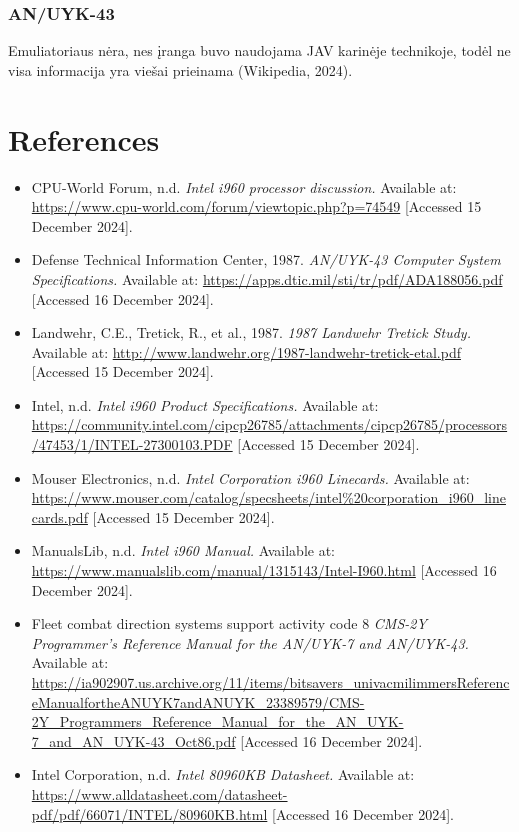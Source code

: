 \documentclass{article}
\begin{document}
\subsubsection{AN/UYK-43}
Emuliatoriaus nėra, nes įranga buvo naudojama JAV karinėje technikoje, todėl ne visa informacija yra viešai prieinama (Wikipedia, 2024).
\section{References}
\begin{itemize}
\item CPU-World Forum, n.d. \textit{Intel i960 processor discussion.} Available at: \url{https://www.cpu-world.com/forum/viewtopic.php?p=74549} [Accessed 15 December 2024].
\item Defense Technical Information Center, 1987. \textit{AN/UYK-43 Computer System Specifications.} Available at: \url{https://apps.dtic.mil/sti/tr/pdf/ADA188056.pdf} [Accessed 16 December 2024].

\item Landwehr, C.E., Tretick, R., et al., 1987. \textit{1987 Landwehr Tretick Study.} Available at: \url{http://www.landwehr.org/1987-landwehr-tretick-etal.pdf} [Accessed 15 December 2024].

\item Intel, n.d. \textit{Intel i960 Product Specifications.} Available at: \url{https://community.intel.com/cipcp26785/attachments/cipcp26785/processors/47453/1/INTEL-27300103.PDF} [Accessed 15 December 2024].

\item Mouser Electronics, n.d. \textit{Intel Corporation i960 Linecards.} Available at: \url{https://www.mouser.com/catalog/specsheets/intel%20corporation_i960_linecards.pdf} [Accessed 15 December 2024].

\item ManualsLib, n.d. \textit{Intel i960 Manual.} Available at: \url{https://www.manualslib.com/manual/1315143/Intel-I960.html} [Accessed 16 December 2024].

\item Fleet combat direction systems support activity code 8 \textit{CMS-2Y Programmer's Reference Manual for the AN/UYK-7 and AN/UYK-43.} Available at: \url{https://ia902907.us.archive.org/11/items/bitsavers_univacmilimmersReferenceManualfortheANUYK7andANUYK_23389579/CMS-2Y_Programmers_Reference_Manual_for_the_AN_UYK-7_and_AN_UYK-43_Oct86.pdf} [Accessed 16 December 2024].

\item Intel Corporation, n.d. \textit{Intel 80960KB Datasheet.} Available at: \url{https://www.alldatasheet.com/datasheet-pdf/pdf/66071/INTEL/80960KB.html} [Accessed 16 December 2024].



\end{itemize}
\end{document}

